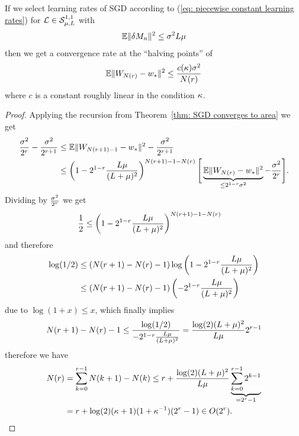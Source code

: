\begin{theorem}
	If we select learning rates of SGD according to (\ref{eq: piecewise constant
	learning rates}) for \(\mathcal{L}\in\mathcal{S}^{1,1}_{{\mu},{L}}\) with
	\begin{align*}
		\mathbb{E}\|\delta M_n\|^2\le \sigma^2L\mu
	\end{align*}
	then we get a convergence rate at the ``halving points'' of
	\begin{align*}
		\mathbb{E}\|W_{N(r)} - w_*\|^2 \le \frac{c(\kappa)\sigma^2}{N(r)}
	\end{align*}
	where \(c\) is a constant roughly linear in the condition \(\kappa\).
\end{theorem}
\begin{proof}
	Applying the recursion from Theorem~\ref{thm: SGD converges to area} we get
	\begin{align*}
		\frac{\sigma^2}{2^r} - \frac{\sigma^2}{2^{r+1}}
		&\le\mathbb{E}\|W_{N(r+1)-1} - w_*\|^2 - \frac{\sigma^2}{2^{r+1}}\\
		&\le \left(1-2^{1-r}\frac{L\mu}{(L+\mu)^2}\right)^{N(r+1)-1-N(r)}
		\Bigg[
			\underbrace{\mathbb{E}\|W_{N(r)}-w_*\|^2}_{\le 2^{1-r}\sigma^2} - \frac{\sigma^2}{2^r}
		\Bigg].
	\end{align*}
	Dividing by \(\tfrac{\sigma^2}{2^r}\) we get
	\begin{align*}
		\frac{1}{2}
		&\le \left(1-2^{1-r}\frac{L\mu}{(L+\mu)^2}\right)^{N(r+1)-1-N(r)}
	\end{align*}
	and therefore
	\begin{align*}
		\log(1/2)
		&\le (N(r+1)-N(r)-1)\log\left(1-2^{1-r}\frac{L\mu}{(L+\mu)^2}\right)\\
		&\le (N(r+1)-N(r)-1)\left(-2^{1-r}\frac{L\mu}{(L+\mu)^2}\right)
	\end{align*}
	due to \(\log(1+x)\le x\), which finally implies
	\begin{align*}
		N(r+1)-N(r)-1
		\le \frac{\log(1/2)}{-2^{1-r}\frac{L\mu}{(L+\mu)^2}}
		= \frac{\log(2)(L+\mu)^2}{L\mu}2^{r-1}
	\end{align*}
	therefore we have
	\begin{align*}
		N(r) &= \sum_{k=0}^{r-1} N(k+1)-N(k)
		\le r + \frac{\log(2)(\ubound+\lbound)^2}{\ubound\lbound}
		\underbrace{\sum_{k=0}^{r-1} 2^{k-1}}_{=2^r-1}\\
		&=r+\log(2)(\condition+1)(1+\condition^{-1})(2^r-1) \in O(2^r).

\end{align*}
\end{proof}
